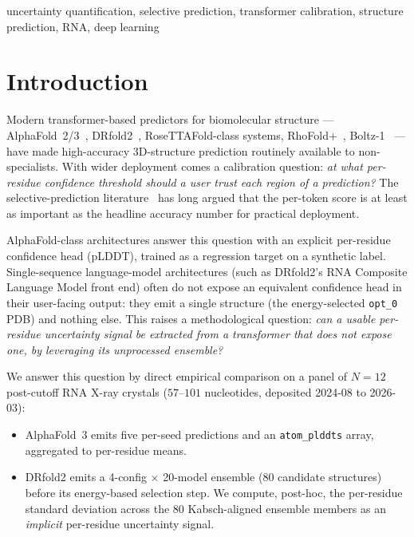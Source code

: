 \documentclass[conference,10pt]{IEEEtran}
\begin{document}
\begin{IEEEkeywords}
uncertainty quantification, selective prediction, transformer
calibration, structure prediction, RNA, deep learning
\end{IEEEkeywords}

\section{Introduction}

Modern transformer-based predictors for biomolecular structure ---
AlphaFold~2/3~\cite{af3_2024}, DRfold2~\cite{drfold2_2025},
RoseTTAFold-class systems, RhoFold+~\cite{rhofold2024}, Boltz-1~\cite{boltz_2024} ---
have made high-accuracy 3D-structure prediction routinely available
to non-specialists. With wider deployment comes a calibration
question: \emph{at what per-residue confidence threshold should a
user trust each region of a prediction?} The selective-prediction
literature~\cite{elyaniv2010} has long argued that the per-token
score is at least as important as the headline accuracy number for
practical deployment.

AlphaFold-class architectures answer this question with an explicit
per-residue confidence head (pLDDT), trained as a regression target
on a synthetic label. Single-sequence language-model architectures
(such as DRfold2's RNA Composite Language Model front end) often do
not expose an equivalent confidence head in their user-facing output:
they emit a single structure (the energy-selected \texttt{opt\_0}
PDB) and nothing else. This raises a methodological question: \emph{can
a usable per-residue uncertainty signal be extracted from a
transformer that does not expose one, by leveraging its unprocessed
ensemble?}

We answer this question by direct empirical comparison on a panel of
$N = 12$ post-cutoff RNA X-ray crystals
($57$--$101$ nucleotides, deposited 2024-08 to 2026-03):

\begin{itemize}
\item AlphaFold~3 emits five per-seed predictions and an
\texttt{atom\_plddts} array, aggregated to per-residue means.
\item DRfold2 emits a 4-config $\times$ 20-model ensemble ($80$
candidate structures) before its energy-based selection step. We
compute, post-hoc, the per-residue standard deviation across the
$80$ Kabsch-aligned ensemble members as an \emph{implicit} per-residue
uncertainty signal.
\end{itemize}
\end{document}
